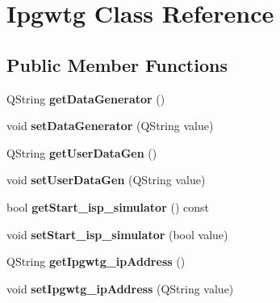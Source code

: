 \hypertarget{class_ipgwtg}{}\section{Ipgwtg Class Reference}
\label{class_ipgwtg}
\subsection*{Public Member Functions}
\begin{DoxyCompactItemize}
\item 
Q\+String {\bfseries get\+Data\+Generator} ()\hypertarget{class_ipgwtg_ac2969f232fdf68afcbc425bfe2ba7143}{}\label{class_ipgwtg_ac2969f232fdf68afcbc425bfe2ba7143}

\item 
void {\bfseries set\+Data\+Generator} (Q\+String value)\hypertarget{class_ipgwtg_aac7cd5164f56ae4dff017e5c9455882b}{}\label{class_ipgwtg_aac7cd5164f56ae4dff017e5c9455882b}

\item 
Q\+String {\bfseries get\+User\+Data\+Gen} ()\hypertarget{class_ipgwtg_a139f41974c4ba9870fcd1e5b380e8a83}{}\label{class_ipgwtg_a139f41974c4ba9870fcd1e5b380e8a83}

\item 
void {\bfseries set\+User\+Data\+Gen} (Q\+String value)\hypertarget{class_ipgwtg_a1f7de2a388ba30606371c646a93256d7}{}\label{class_ipgwtg_a1f7de2a388ba30606371c646a93256d7}

\item 
bool {\bfseries get\+Start\+\_\+isp\+\_\+simulator} () const \hypertarget{class_ipgwtg_ad38db27c6597f5f75e3b2ffbe2358690}{}\label{class_ipgwtg_ad38db27c6597f5f75e3b2ffbe2358690}

\item 
void {\bfseries set\+Start\+\_\+isp\+\_\+simulator} (bool value)\hypertarget{class_ipgwtg_adbd149bdef5a48283a089839e7022ef8}{}\label{class_ipgwtg_adbd149bdef5a48283a089839e7022ef8}

\item 
Q\+String {\bfseries get\+Ipgwtg\+\_\+ip\+Address} ()\hypertarget{class_ipgwtg_aff9e01b6f4334ed47be80e0fcaffae8e}{}\label{class_ipgwtg_aff9e01b6f4334ed47be80e0fcaffae8e}

\item 
void {\bfseries set\+Ipgwtg\+\_\+ip\+Address} (Q\+String value)\hypertarget{class_ipgwtg_a60e773b6803400d5de6ac9c3beac0d41}{}\label{class_ipgwtg_a60e773b6803400d5de6ac9c3beac0d41}


\end{DoxyCompactItemize}
